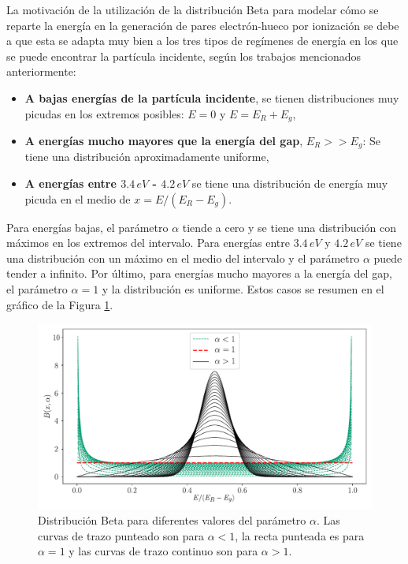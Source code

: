 La motivación de la utilización de la distribución Beta para modelar cómo se reparte la energía en la generación de pares electrón-hueco por ionización se debe a que esta se adapta muy bien a los tres tipos de regímenes de energía en los que se puede encontrar la partícula incidente, según los trabajos mencionados anteriormente:
\begin{itemize}
    \item \textbf{A bajas energías de la partícula incidente}, se tienen distribuciones muy picudas en los extremos posibles: $E = 0$ y $E = E_{R}+E_{g}$,
    \item \textbf{A energías mucho mayores que la energía del gap}, $E_{R} >> E_{g}$: Se tiene una distribución aproximadamente uniforme,
    \item \textbf{A energías entre $3.4\,\si{eV}$ - $4.2\,\si{eV}$} se tiene una distribución de energía muy picuda en el medio de $x = E/(E_{R} - E_{g})$.
\end{itemize}
Para energías bajas, el parámetro $\alpha$ tiende a cero y se tiene una distribución con máximos en los extremos del intervalo. Para energías entre $3.4\,\si{eV}$ y $4.2\,\si{eV}$ se tiene una distribución con un máximo en el medio del intervalo y el parámetro $\alpha$ puede tender a infinito. Por último, para energías mucho mayores a la energía del gap, el parámetro $\alpha = 1$ y la distribución es uniforme. Estos casos se resumen en el gráfico de la Figura \ref{fig:BetaDist}.
\begin{figure}[h]
    \centering
        \includegraphics[scale=0.5]{Figs/BetaDistFig.pdf}
    \caption{Distribución Beta para diferentes valores del parámetro $\alpha$. Las curvas de trazo punteado son para $\alpha < 1$, la recta punteada es para $\alpha=1$ y las curvas de trazo continuo son para $\alpha>1$.}
    \label{fig:BetaDist}
\end{figure}

